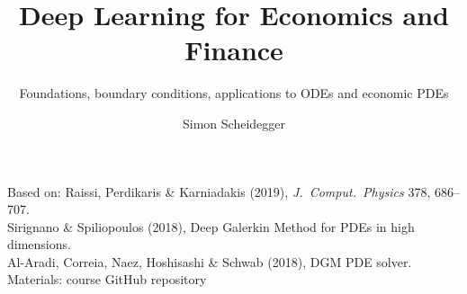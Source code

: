 \documentclass[aspectratio=169,11pt]{beamer}
\title[Deep Learning for Dynamic Economic Models]
{Deep Learning for Economics and Finance}
\subtitle{Foundations, boundary conditions, applications to ODEs and economic PDEs}
\author{Simon Scheidegger}
\institute[HEC Lausanne]{HEC, University of Lausanne}
\date{}
\begin{document}
\newcommand{\exercisepause}{%
  \tikz[baseline=(X.base)]{\node[fill=darkgreen!80!black, text=white,
  rounded corners=2pt, inner sep=3pt, font=\scriptsize\bfseries](X){PAUSE, 5 min};}}



{
\begin{frame}
\titlepage
\vspace{-0.6cm}
\begin{center}
\begingroup\sloppy{}
{\scriptsize Based on: Raissi, Perdikaris \& Karniadakis (2019), \emph{J.\ Comput.\ Physics} 378, 686--707.}\\[1pt]
{\scriptsize Sirignano \& Spiliopoulos (2018), Deep Galerkin Method for PDEs in high dimensions.}\\[1pt]
{\scriptsize Al-Aradi, Correia, Naez, Hoshisashi \& Schwab (2018), DGM PDE solver.}\\[2pt]
{\scriptsize Materials: course GitHub repository}
\endgroup
\end{center}
\end{frame}
}
\end{document}
